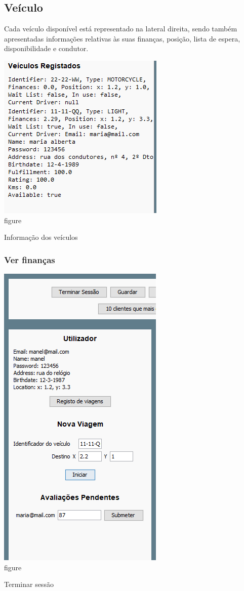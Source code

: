 \documentclass[a4paper]{article}
\begin{document}
\subsection{Veículo}
Cada veículo disponível está representado na lateral direita, sendo também apresentadas informações relativas às suas finanças, posição, lista de espera, disponibilidade e condutor.
\begin{center}
  \includegraphics[scale=0.75]{veiculo_info}\\
  \caption{figure}{Informação dos veículos}
  \label{fig:picture}
\end{center}
\subsubsection{Ver finanças}
\begin{center}
  \includegraphics[scale=0.75]{terminarsessao}\\
  \caption{figure}{Terminar sessão}
  \label{fig:picture}
\end{center}
\end{document}
